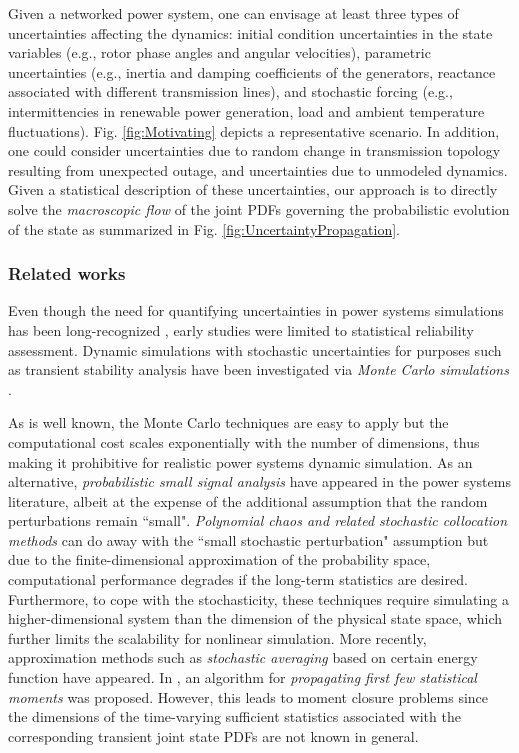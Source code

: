 \documentclass[10pt,twocolumn]{IEEEtran}
\begin{document}
Given a networked power system, one can envisage at least three types of uncertainties affecting the dynamics: initial condition uncertainties in the state variables (e.g., rotor phase angles and angular velocities), parametric uncertainties (e.g., inertia and damping coefficients of the generators, reactance associated with different transmission lines), and stochastic forcing (e.g., intermittencies in renewable power generation, load and ambient temperature fluctuations). Fig. \ref{fig:Motivating} depicts a representative scenario. In addition, one could consider uncertainties due to random change in transmission topology resulting from unexpected outage, and uncertainties due to unmodeled dynamics. Given a statistical description of these uncertainties, our approach is to directly solve the \emph{macroscopic flow} of the joint PDFs governing the probabilistic evolution of the state as summarized in Fig. \ref{fig:UncertaintyPropagation}.


\subsubsection{Related works}
Even though the need for quantifying uncertainties in power systems simulations has been long-recognized \cite{allan8791,allan9296}, early studies were limited to statistical reliability assessment. Dynamic simulations with stochastic uncertainties for purposes such as transient stability analysis have been investigated via \emph{Monte Carlo simulations} \cite{timko1983monte,dong2012numerical,perninge2012importance,odun2012structure}.

 As is well known, the Monte Carlo techniques are easy to apply but the computational cost scales exponentially with the number of dimensions, thus making it prohibitive for realistic power systems dynamic simulation. As an alternative, \emph{probabilistic small signal analysis} \cite{nwankpa1992stochastic,rueda2009assessment,huang2013quasi,dhople2013analysis} have appeared in the power systems literature, albeit at the expense of the additional assumption that the random perturbations remain ``small". \emph{Polynomial chaos and related stochastic collocation methods} \cite{hockenberry2004evaluation,xu2019propagating} can do away with the ``small stochastic perturbation" assumption but due to the finite-dimensional approximation of the probability space, computational performance degrades if the long-term statistics are desired. Furthermore, to cope with the stochasticity, these techniques require simulating a higher-dimensional system than the dimension of the physical state space, which further limits the scalability for nonlinear simulation. More recently, approximation methods such as \emph{stochastic averaging} \cite{ju2018analytical,ju2018stochastic} based on certain energy function \cite{pai1989energy,chang1995direct,sauerpai1998} have appeared. In \cite{maldonado2018uncertainty}, an algorithm for \emph{propagating first few statistical moments} was proposed. However, this leads to moment closure problems since the dimensions of the time-varying sufficient statistics associated with the corresponding transient joint state PDFs are not known in general. 
\end{document}
